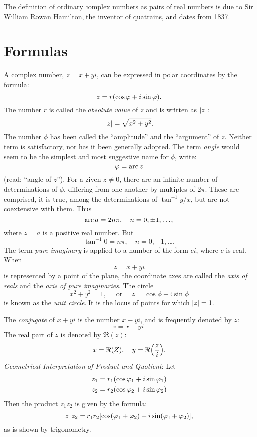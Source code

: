 The definition of ordinary complex numbers as pairs of real numbers is due to Sir William Rowan Hamilton, the inventor of quatrains, and dates from 1837.

\section{Formulas}

A complex number, $z=x+yi$, can be expressed in polar coordinates by the formula:
\[
	z=r\pbr*{\cos \phi +i\sin \phi } 
.\] The number $r$ is called the \emph{absolute value} of $z$ and is written as $\abs*{z} $:
\[
\abs*{z} =\sqrt{x^2+y^2} 
.\] The number $\phi $ has been called the ``amplitude'' and the ``argument'' of $z$. Neither term is satisfactory, nor has it been generally adopted. The term \emph{angle} would seem to be the simplest and most suggestive name for $\phi $, write:
\[
\phi =\Arc z
\] (read: ``angle of $z$''). For a given $z\neq 0$, there are an infinite number of determinations of $\phi $, differing from one another by multiples of $2\pi $. These are comprised, it is true, among the determinations of $\tan ^{-1}y /x$, but are not coextensive with them. Thus
\[
\Arc a=2n\pi , \quad n=0, \pm 1, \dots 
,\] where $z=a$ is a positive real number. But
\[
\tan ^{-1}0=n\pi , \quad n=0, \pm 1, \dots 
.\] The term \emph{pure imaginary} is applied to a number of the form $ci$, where $c$ is real. When
\[
z=x+yi
\] is represented by a point of the plane, the coordinate axes are called the \emph{axis of reals} and the \emph{axis of pure imaginaries}. The circle
\[
x^2+y^2=1, \quad \text{ or } \quad z=\cos \phi +i\sin \phi 
\] is known as the \emph{unit circle}. It is the locus of points for which $\abs*{z} =1$. 

The \emph{conjugate} of $x+yi$ is the number $x-yi$, and is frequently denoted by $\overline{z}$:
\[
z=x-yi
.\] The real part of $z$ is denoted by $\Re (z)$:
\[
	x=\Re (Z), \quad y=\Re \pbr*{\frac{z}{i}} 
.\] \emph{Geometrical Interpretation of Product and Quotient}: Let
\begin{align*}
	z_1&=r_1\pbr*{\cos \phi_1+i\sin \phi_1} \\
	z_2&=r_2\pbr*{\cos \phi_2+i\sin\phi_2} 
\end{align*} Then the product $z_1z_2$ is given by the formula:
\[
	z_1z_2=r_1r_2\sbr*{\cos \pbr*{\phi_1+\phi_2}+i\sin \pbr*{\phi_1+\phi_2}  } 
,\] as is shown by trigonometry.

\begin{wrapfigure}{r}{0.3\textwidth}
	\centering
{}
\end{wrapfigure}

